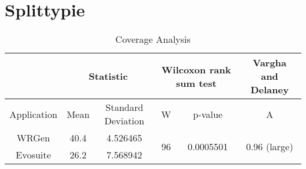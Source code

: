 \section{Splittypie}
\begin{table}[H]
	\centering
	\caption{Coverage Analysis}
	\begin{adjustbox}{max width=\textwidth}
		\begin{tabular}{|c|c|c|c|c|c|}
		\hline
			& \multicolumn{2}{c|}{Statistic} & \multicolumn{2}{c|}{Wilcoxon rank sum test} & Vargha and Delaney    \\
		\hline
			Application & Mean   & Standard Deviation   & W                               & p-value                             & A            			         \\
		\hline
			WRGen       & 40.4   & 4.526465             & \multirow{2}{*}{96}             & \multirow{2}{*}{0.0005501}          & \multirow{2}{*}{0.96 (large)}  \\
		\cline{1-3}
			Evosuite    & 26.2   & 7.568942             &                                 &                                     &            			   		 \\
		\hline
		\end{tabular}
	\end{adjustbox}
\end{table}

